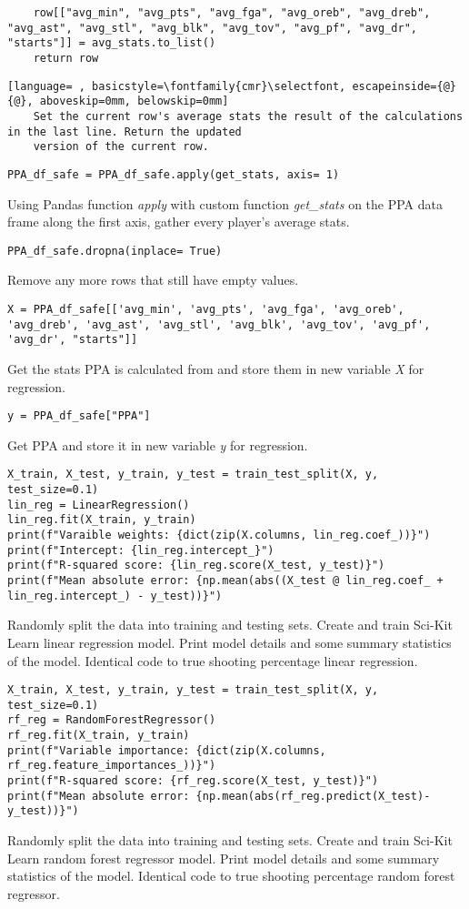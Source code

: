 \documentclass{article}
\begin{document}
\begin{lstlisting}
    row[["avg_min", "avg_pts", "avg_fga", "avg_oreb", "avg_dreb", "avg_ast", "avg_stl", "avg_blk", "avg_tov", "avg_pf", "avg_dr", "starts"]] = avg_stats.to_list()
    return row
\end{lstlisting}
\begin{lstlisting}[language= , basicstyle=\fontfamily{cmr}\selectfont, escapeinside={@}{@}, aboveskip=0mm, belowskip=0mm]
    Set the current row's average stats the result of the calculations in the last line. Return the updated
    version of the current row.
\end{lstlisting}
\begin{lstlisting}
PPA_df_safe = PPA_df_safe.apply(get_stats, axis= 1)
\end{lstlisting}
Using Pandas function \textit{apply} with custom function \textit{get_stats} on the PPA data frame along the first axis, gather every player's average stats.
\begin{lstlisting}
PPA_df_safe.dropna(inplace= True)
\end{lstlisting}
Remove any more rows that still have empty values.
\begin{lstlisting}
X = PPA_df_safe[['avg_min', 'avg_pts', 'avg_fga', 'avg_oreb', 'avg_dreb', 'avg_ast', 'avg_stl', 'avg_blk', 'avg_tov', 'avg_pf', 'avg_dr', "starts"]]
\end{lstlisting}
Get the stats PPA is calculated from and store them in new variable \textit{X} for regression.
\begin{lstlisting}
y = PPA_df_safe["PPA"]
\end{lstlisting}
Get PPA and store it in new variable \textit{y} for regression.
\begin{lstlisting}
X_train, X_test, y_train, y_test = train_test_split(X, y, test_size=0.1)
lin_reg = LinearRegression()
lin_reg.fit(X_train, y_train)
print(f"Varaible weights: {dict(zip(X.columns, lin_reg.coef_))}")
print(f"Intercept: {lin_reg.intercept_}")
print(f"R-squared score: {lin_reg.score(X_test, y_test)}")
print(f"Mean absolute error: {np.mean(abs((X_test @ lin_reg.coef_ + lin_reg.intercept_) - y_test))}")
\end{lstlisting}
Randomly split the data into training and testing sets. Create and train Sci-Kit Learn linear regression model. Print model details and some summary statistics of the model. Identical code to true shooting percentage linear regression.
\begin{lstlisting}
X_train, X_test, y_train, y_test = train_test_split(X, y, test_size=0.1)
rf_reg = RandomForestRegressor()
rf_reg.fit(X_train, y_train)
print(f"Variable importance: {dict(zip(X.columns, rf_reg.feature_importances_))}")
print(f"R-squared score: {rf_reg.score(X_test, y_test)}")
print(f"Mean absolute error: {np.mean(abs(rf_reg.predict(X_test)- y_test))}")
\end{lstlisting}
Randomly split the data into training and testing sets. Create and train Sci-Kit Learn random forest regressor model. Print model details and some summary statistics of the model. Identical code to true shooting percentage random forest regressor.
\newpage
\end{document}
